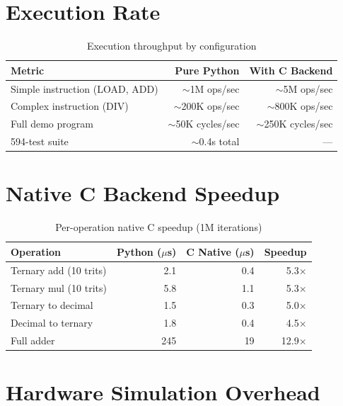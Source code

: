 \documentclass[10pt,a4paper,twoside]{book}
\begin{document}
\section{Execution Rate}

\begin{table}[H]
\centering
\caption{Execution throughput by configuration}
\label{app:execrate}
\begin{tabular}{lrr}
\toprule
Metric & Pure Python & With C Backend \\
\midrule
Simple instruction (LOAD, ADD) & $\sim$1M ops/sec & $\sim$5M ops/sec \\
Complex instruction (DIV) & $\sim$200K ops/sec & $\sim$800K ops/sec \\
Full demo program & $\sim$50K cycles/sec & $\sim$250K cycles/sec \\
594-test suite & $\sim$0.4s total & --- \\
\bottomrule
\end{tabular}
\end{table}

\section{Native C Backend Speedup}

\begin{table}[H]
\centering
\caption{Per-operation native C speedup (1M iterations)}
\label{app:nativeperf}
\begin{tabular}{lrrr}
\toprule
Operation & Python ($\mu$s) & C Native ($\mu$s) & Speedup \\
\midrule
Ternary add (10 trits) & 2.1 & 0.4 & 5.3$\times$ \\
Ternary mul (10 trits) & 5.8 & 1.1 & 5.3$\times$ \\
Ternary to decimal & 1.5 & 0.3 & 5.0$\times$ \\
Decimal to ternary & 1.8 & 0.4 & 4.5$\times$ \\
Full adder & 245 & 19 & 12.9$\times$ \\
\bottomrule
\end{tabular}
\end{table}

\section{Hardware Simulation Overhead}
\end{document}
